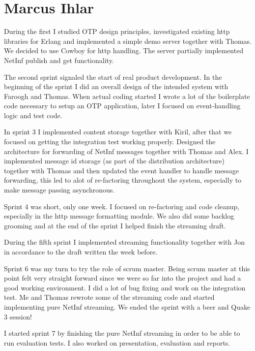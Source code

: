 \section{Marcus Ihlar}
During the first I studied OTP design principles, investigated existing http libraries for Erlang and implemented a simple demo server together with Thomas. We decided to use Cowboy for http handling. The server partially implemented NetInf publish and get functionality.

The second sprint signaled the start of real product development. In the beginning of the sprint I did an overall design of the intended system with Faroogh and Thomas. When actual coding started I wrote a lot of the boilerplate code necessary to setup an OTP application, later I focused on event-handling logic and test code.

In sprint 3 I implemented content storage together with Kiril, after that we focused on getting the integration test working properly. Designed the architecture for forwarding of NetInf messages together with Thomas and Alex. I implemented message id storage (as part of the distribution architecture) together with Thomas and then updated the event handler to handle message forwarding, this led to alot of re-factoring throughout the system, especially to make message passing asynchronous. 

Sprint 4 was short, only one week. I focused on re-factoring and code cleanup, especially in the http message formatting module. We also did some backlog grooming and at the end of the sprint I helped finish the streaming draft.

During the fifth sprint I implemented streaming functionality together with Jon in accordance to the draft written the week before. 

Sprint 6 was my turn to try the role of scrum master. Being scrum master at this point felt very straight forward since we were so far into the project and had a good working environment. I did a lot of bug fixing and work on the integration test. Me and Thomas rewrote some of the streaming code and started implementing pure NetInf streaming. We ended the sprint with a beer and Quake 3 session!

I started sprint 7 by finishing the pure NetInf streaming in order to be able to run evaluation tests. I also worked on presentation, evaluation and reports.
 

 



